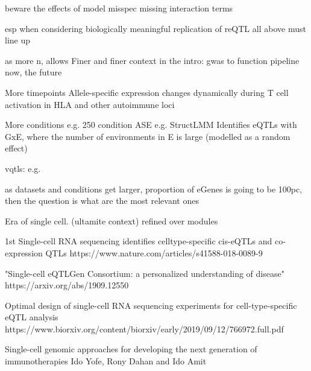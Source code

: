 \begin{outline}
        beware the effects of model misspec
            missing interaction terms

        esp when considering biologically meaningful replication of reQTL
            all above must line up

as more n, allows
Finer and finer context
    in the intro: gwas to function pipeline
    now, the future

    More timepoints
    Allele-specific expression changes dynamically during T cell activation in HLA and other autoimmune loci

    More conditions
    e.g. 250 condition ASE %
    e.g. StructLMM 
        Identifies eQTLs with GxE, where the number of environments in E is large (modelled as a random effect)

        vqtls: e.g. %

    as datasets and conditions get larger, proportion of eGenes is going to be 100pc, then the question is what are the most relevant ones

    Era of single cell. (ultamite context)
        refined over modules
        
        1st
        Single-cell RNA sequencing identifies celltype-specific cis-eQTLs and co-expression QTLs
        https://www.nature.com/articles/s41588-018-0089-9

        "Single-cell eQTLGen Consortium: a personalized understanding of disease"
        https://arxiv.org/abs/1909.12550

        Optimal design of single-cell RNA sequencing experiments for cell-type-specific eQTL analysis
        https://www.biorxiv.org/content/biorxiv/early/2019/09/12/766972.full.pdf

        Single-cell genomic approaches for developing the next generation of immunotherapies Ido Yofe, Rony Dahan and Ido Amit



\end{outline}
